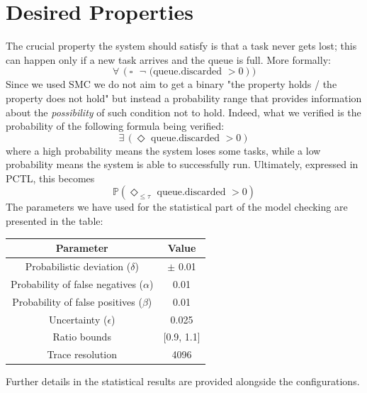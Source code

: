 \documentclass{article}
\begin{document}
	\section{Desired Properties}
		The crucial property the system should satisfy is that a task never gets lost; this can happen only if a new task arrives and the queue is full. More formally:
		\begin{equation}
			\forall\, (\square \text{ $\neg$ (queue.discarded } > 0))
		\end{equation}
		Since we used SMC we do not aim to get a binary "the property holds / the property does not hold" but instead a probability range that provides information about the \emph{possibility} of such condition not to hold. Indeed, what we verified is the probability of the following formula being verified:
		\begin{equation}
			\exists\, (\Diamond \text{ queue.discarded } > 0)
		\end{equation}
		where a high probability means the system loses some tasks, while a low probability means the system is able to successfully run. Ultimately, expressed in PCTL, this becomes
		\begin{equation}
			\mathbb{P} (\Diamond_{\leq\tau} \text{ queue.discarded } > 0)
		\end{equation}
		The parameters we have used for the statistical part of the model checking are presented in the table:
		\begin{center}
			\begin{tabular}{ | c | c |}
				\hline
				Parameter & Value \\
				\hline
				\hline
				Probabilistic deviation ($\delta$) & $\pm$ 0.01 \\
				\hline
				Probability of false negatives ($\alpha$) & 0.01 \\
				\hline
				Probability of false positives ($\beta$) & 0.01 \\
				\hline
				Uncertainty ($\epsilon$) & 0.025 \\
				\hline
				Ratio bounds & [0.9, 1.1]\\
				\hline
				Trace resolution & 4096 \\
				\hline
			\end{tabular}
		\end{center}
		Further details in the statistical results are provided alongside the configurations.
\end{document}
